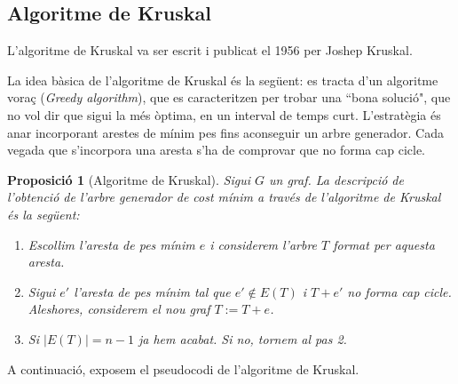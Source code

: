 \documentclass{article}
\newtheorem{prop}{Proposició}[section]
\begin{document}
\subsection{Algoritme de Kruskal}
L'algoritme de Kruskal va ser escrit i publicat el 1956 per Joshep Kruskal. \cite{11}\par
La idea bàsica de l'algoritme de Kruskal és la següent: es tracta d'un algoritme voraç (\textit{Greedy algorithm}), que es caracteritzen per trobar una ``bona solució", que no vol dir que sigui la més òptima, en un interval de temps curt. L’estratègia és anar incorporant arestes de mínim pes fins aconseguir un arbre generador. Cada vegada que s’incorpora una aresta s’ha de comprovar que no forma cap cicle.
\begin{prop}[Algoritme de Kruskal]
    Sigui $G$ un graf. La descripció de l'obtenció de l'arbre generador de cost mínim a través de l'algoritme de Kruskal és la següent:
    \begin{enumerate}
        \item Escollim l'aresta de pes mínim $e$ i considerem l'arbre $T$ format per aquesta aresta.
        \item Sigui $e'$ l’aresta de pes mínim tal que $e'\notin E(T)$ i $T+e'$ no forma cap cicle. Aleshores, considerem el nou graf $T:=T+e$.
        \item Si $|E(T)|=n-1$ ja hem acabat. Si no, tornem al pas 2.
    \end{enumerate}
\end{prop}
A continuació, exposem el pseudocodi de l'algoritme de Kruskal.
\end{document}
